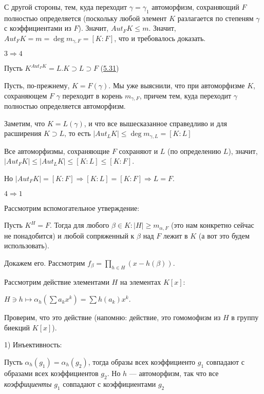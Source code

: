 \documentclass[../main.tex]{subfiles}
\begin{document}
    С другой стороны, тем, куда переходит $\gamma = \gamma_1$ автоморфизм,
    сохраняющий $F$ полностью определяется (поскольку любой элемент $K$
    разлагается по степеням $\gamma$ с коэффициентами из $F$). Значит,
    $Aut_FK \leqslant m$. Значит, $Aut_FK = m = \deg m_{\gamma, F} = [K : F]$,
    что и требовалось доказать.

    $3 \Rightarrow 4$

    Пусть $K^{Aut_FK} = L. K \supset L \supset F$ (\hyperlink{5.31}{5.31})

    Пусть, по-прежнему, $K = F(\gamma)$. Мы уже выяснили, что при автоморфизме
    $K$, сохраняющем $F$ $\gamma$ переходит в корень $m_{\gamma, F}$, причем
    тем, куда переходит $\gamma$ полностью определяется автоморфизм.

    Заметим, что $K = L(\gamma)$, и что все вышесказанное справедливо и для
    расширения $K \supset L$, то есть $|Aut_LK| \leqslant \deg m_{\gamma, L}
    = [K : L]$

    Все автоморфизмы, сохраняющие $F$ сохраняют и $L$ (по определению $L$),
    значит, $|Aut_FK| \leqslant |Aut_LK| \leqslant [K : L] \leqslant [K : F]$.

    Но $|Aut_FK| = [K : F] \Rightarrow [K : L] = [K : F] \Rightarrow L = F$.

    $4 \Rightarrow 1$

    \hypertarget{9.1.useful.statement}{Рассмотрим вспомогательное утверждение:}

    Пусть $K^H = F$. Тогда для любого $\beta \in K: |H| \geqslant
    m_{\alpha, F}$ (это нам конкретно сейчас не понадобится)
    и любой сопряженный к $\beta$ над $F$ лежит в $K$
    (а вот это будем использовать).

    Докажем его. Рассмотрим $f_\beta
    = {\displaystyle \prod_{h \in H}(x - h(\beta))}$.

    Рассмотрим действие элементами $H$ на элементах
    $K[x]:$

    $H \ni h \mapsto \alpha_h(\sum a_k x^k) = \sum h(a_k) x^k$.

    Проверим, что это действие
    (напомню: действие, это гомомофизм из $H$ в группу биекций $K[x]$).

    1) Инъективность:

    Пусть $\alpha_h(g_1) = \alpha_h(g_2)$, тогда образы всех
    коэффициенто $g_1$ совпадают с образами всех коэффициентов $g_2$.
    Но $h$ --- автоморфизм, так что все \textit{коэффициенты} $g_1$ совпадают
    с коэффициентами $g_2$
\end{document}
